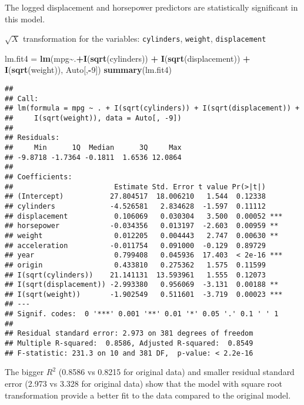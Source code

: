 \documentclass[
]{article}
\newenvironment{Shaded}{\begin{snugshade}}{\end{snugshade}}
\newcommand{\DecValTok}[1]{\textcolor[rgb]{0.00,0.00,0.81}{#1}}
\newcommand{\FunctionTok}[1]{\textcolor[rgb]{0.13,0.29,0.53}{\textbf{#1}}}
\newcommand{\NormalTok}[1]{#1}
\newcommand{\OtherTok}[1]{\textcolor[rgb]{0.56,0.35,0.01}{#1}}
\newcommand{\SpecialCharTok}[1]{\textcolor[rgb]{0.81,0.36,0.00}{\textbf{#1}}}
\begin{document}
The logged displacement and horsepower predictors are statistically
significant in this model.

\(\sqrt{X}\) transformation for the variables: \texttt{cylinders},
\texttt{weight}, \texttt{displacement}

\begin{Shaded}
\begin{Highlighting}[]
\NormalTok{lm.fit4 }\OtherTok{=} \FunctionTok{lm}\NormalTok{(mpg}\SpecialCharTok{\textasciitilde{}}\NormalTok{.}\SpecialCharTok{+}\FunctionTok{I}\NormalTok{(}\FunctionTok{sqrt}\NormalTok{(cylinders)) }\SpecialCharTok{+}  \FunctionTok{I}\NormalTok{(}\FunctionTok{sqrt}\NormalTok{(displacement)) }\SpecialCharTok{+} \FunctionTok{I}\NormalTok{(}\FunctionTok{sqrt}\NormalTok{(weight)), Auto[,}\SpecialCharTok{{-}}\DecValTok{9}\NormalTok{])}
\FunctionTok{summary}\NormalTok{(lm.fit4)}
\end{Highlighting}
\end{Shaded}

\begin{verbatim}
## 
## Call:
## lm(formula = mpg ~ . + I(sqrt(cylinders)) + I(sqrt(displacement)) + 
##     I(sqrt(weight)), data = Auto[, -9])
## 
## Residuals:
##     Min      1Q  Median      3Q     Max 
## -9.8718 -1.7364 -0.1811  1.6536 12.0864 
## 
## Coefficients:
##                        Estimate Std. Error t value Pr(>|t|)    
## (Intercept)           27.804517  18.006210   1.544  0.12338    
## cylinders             -4.526581   2.834628  -1.597  0.11112    
## displacement           0.106069   0.030304   3.500  0.00052 ***
## horsepower            -0.034356   0.013197  -2.603  0.00959 ** 
## weight                 0.012205   0.004443   2.747  0.00630 ** 
## acceleration          -0.011754   0.091000  -0.129  0.89729    
## year                   0.799408   0.045936  17.403  < 2e-16 ***
## origin                 0.433810   0.275362   1.575  0.11599    
## I(sqrt(cylinders))    21.141131  13.593961   1.555  0.12073    
## I(sqrt(displacement)) -2.993380   0.956069  -3.131  0.00188 ** 
## I(sqrt(weight))       -1.902549   0.511601  -3.719  0.00023 ***
## ---
## Signif. codes:  0 '***' 0.001 '**' 0.01 '*' 0.05 '.' 0.1 ' ' 1
## 
## Residual standard error: 2.973 on 381 degrees of freedom
## Multiple R-squared:  0.8586, Adjusted R-squared:  0.8549 
## F-statistic: 231.3 on 10 and 381 DF,  p-value: < 2.2e-16
\end{verbatim}

The bigger \(R^2\) (0.8586 vs 0.8215 for original data) and smaller
residual standard error (2.973 vs 3.328 for original data) show that the
model with square root transformation provide a better fit to the data
compared to the original model.
\end{document}
